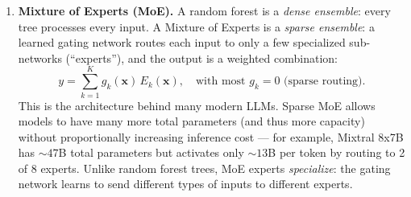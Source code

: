 \documentclass[submit]{../harvardml}
\begin{document}
\begin{problem}
\begin{enumerate}
\begin{enumerate}
    \item \textbf{[8 points]} Prove that the variance of the ensemble prediction is:
    \[
    \text{Var}\!\left(\frac{1}{B}\sum_{b=1}^{B} T_b(\mathbf{x})\right) = \rho\,\sigma^2 + \frac{1-\rho}{B}\,\sigma^2.
    \]
    \emph{Hint:} Expand the variance of the sum, separate the diagonal terms ($i = j$) from the off-diagonal terms ($i \neq j$), and use $\text{Cov}(T_i, T_j) = \rho\,\sigma^2$.

    \item \textbf{[4 points]} Analyze the formula:
    \begin{enumerate}
        \item What does the ensemble variance converge to as $B \to \infty$? Can we make the variance arbitrarily small by adding more trees?
        \item What happens when $\rho = 0$? When $\rho = 1$? Relate each case to a practical scenario.
    \end{enumerate}

    \item \textbf{[4 points]} Random forests use $m = \lfloor\sqrt{d}\rfloor$ features per split (for classification). Using the formula from (d), explain why $m = 1$ (one random feature per split) is generally a bad idea, even though it minimizes $\rho$. What tradeoff does $m$ control?
\end{enumerate}

\item %
\medskip
\noindent
\textbf{Mixture of Experts (MoE).}\quad
A random forest is a \emph{dense ensemble}: every tree processes every input. A Mixture of Experts is a \emph{sparse ensemble}: a learned gating network routes each input to only a few specialized sub-networks (``experts''), and the output is a weighted combination:
\[
y = \sum_{k=1}^{K} g_k(\mathbf{x})\, E_k(\mathbf{x}), \quad \text{with most } g_k = 0 \text{ (sparse routing)}.
\]
This is the architecture behind many modern LLMs. Sparse MoE allows models to have many more total parameters (and thus more capacity) without proportionally increasing inference cost --- for example, Mixtral 8x7B has ${\sim}47$B total parameters but activates only ${\sim}13$B per token by routing to 2 of 8 experts. Unlike random forest trees, MoE experts \emph{specialize}: the gating network learns to send different types of inputs to different experts.


\end{enumerate}
\end{problem}
\end{document}
